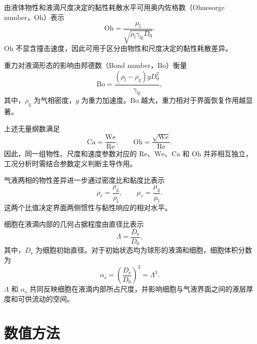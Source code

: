由液体物性和液滴尺度决定的黏性耗散水平可用奥内佐格数（Ohnesorge number，$\mathrm{Oh}$）表示
\begin{equation}
\mathrm{Oh}
=
\frac{\mu_{\mathrm l}}
{\sqrt{\rho_{\mathrm l}\gamma_{\mathrm{lg}}D_0}}.
\label{eq:ch2_oh}
\end{equation}
$\mathrm{Oh}$ 不显含撞击速度，因此可用于区分由物性和尺度决定的黏性耗散差异。

重力对液滴形态的影响由邦德数（Bond number，$\mathrm{Bo}$）衡量
\begin{equation}
\mathrm{Bo}
=
\frac{\left(\rho_{\mathrm l}-\rho_{\mathrm g}\right)gD_0^2}
{\gamma_{\mathrm{lg}}},
\label{eq:ch2_bo}
\end{equation}
其中，$\rho_{\mathrm g}$ 为气相密度，$g$ 为重力加速度。$\mathrm{Bo}$ 越大，重力相对于界面恢复作用越显著。

上述无量纲数满足
\begin{equation}
\mathrm{Ca}
=
\frac{\mathrm{We}}{\mathrm{Re}},
\qquad
\mathrm{Oh}
=
\frac{\sqrt{\mathrm{We}}}{\mathrm{Re}}.
\label{eq:ch2_dimensionless_relation}
\end{equation}
因此，同一组物性、尺度和速度参数对应的 $\mathrm{Re}$、$\mathrm{We}$、$\mathrm{Ca}$ 和 $\mathrm{Oh}$ 并非相互独立，工况分析时需结合参数定义判断主导作用。

气液两相的物性差异进一步通过密度比和黏度比表示
\begin{equation}
\rho_r
=
\frac{\rho_{\mathrm g}}{\rho_{\mathrm l}},
\qquad
\mu_r
=
\frac{\mu_{\mathrm g}}{\mu_{\mathrm l}}.
\label{eq:ch2_property_ratio}
\end{equation}
这两个比值决定界面两侧惯性与黏性响应的相对水平。

细胞在液滴内部的几何占据程度由直径比表示
\begin{equation}
\Lambda
=
\frac{D_{\mathrm s}}{D_0},
\label{eq:ch2_size_ratio}
\end{equation}
其中，$D_{\mathrm s}$ 为细胞初始直径。对于初始状态均为球形的液滴和细胞，细胞体积分数为
\begin{equation}
\alpha_{\mathrm s}
=
\left(\frac{D_{\mathrm s}}{D_0}\right)^3
=
\Lambda^3.
\label{eq:ch2_volume_fraction}
\end{equation}
$\Lambda$ 和 $\alpha_{\mathrm s}$ 共同反映细胞在液滴内部所占尺度，并影响细胞与气液界面之间的液层厚度和可供流动的空间。

\section{数值方法}
\label{sec:ch2_numerical_method}

